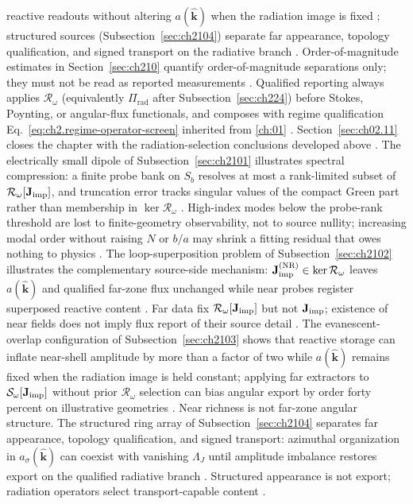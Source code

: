 reactive readouts without altering \(a(\widehat{\mathbf{k}})\) when the radiation image is fixed
\cite{mandel1995}; structured sources (Subsection~\ref{sec:ch2104}) separate far
appearance, topology qualification, and signed transport on the radiative branch
\cite{belinfante1940}. Order-of-magnitude estimates in Section~\ref{sec:ch210} quantify
order-of-magnitude separations only; they must not be read as reported measurements
\cite{hansen1988}. Qualified reporting always applies \(\mathcal{R}_\omega\) (equivalently
\(\Pi_{\mathrm{rad}}\) after Subsection~\ref{sec:ch224}) before Stokes, Poynting, or angular-flux functionals, and
composes with regime qualification Eq.~\eqref{eq:ch2.regime-operator-screen} inherited from
\ref{ch:01} \cite{stratton1941}. Section~\ref{sec:ch02.11} closes the chapter with the radiation-selection conclusions developed above \cite{stratton1941}.
The electrically small dipole of Subsection~\ref{sec:ch2101} illustrates spectral compression: a finite probe bank on $S_b$ resolves at most a rank-limited subset of $\mathcal{R}_\omega[\mathbf{J}_{\mathrm{imp}}]$, and truncation error tracks singular values of the compact Green part rather than membership in $\ker\mathcal{R}_\omega$ \cite{harrington2001}. High-index modes below the probe-rank threshold are lost to finite-geometry observability, not to source nullity; increasing modal order without raising $N$ or $b/a$ may shrink a fitting residual that owes nothing to physics \cite{hansen1988}. The loop-superposition problem of Subsection~\ref{sec:ch2102} illustrates the complementary source-side mechanism: $\mathbf{J}_{\mathrm{imp}}^{\mathrm{(NR)}}\in\ker\mathcal{R}_\omega$ leaves $a(\widehat{\mathbf{k}})$ and qualified far-zone flux unchanged while near probes register superposed reactive content \cite{devaney2004}. Far data fix $\mathcal{R}_\omega[\mathbf{J}_{\mathrm{imp}}]$ but not $\mathbf{J}_{\mathrm{imp}}$; existence of near fields does not imply flux report of their source detail \cite{stratton1941}. The evanescent-overlap configuration of Subsection~\ref{sec:ch2103} shows that reactive storage can inflate near-shell amplitude by more than a factor of two while $a(\widehat{\mathbf{k}})$ remains fixed when the radiation image is held constant; applying far extractors to $\mathcal{S}_\omega[\mathbf{J}_{\mathrm{imp}}]$ without prior $\mathcal{R}_\omega$ selection can bias angular export by order forty percent on illustrative geometries \cite{hansen1988}. Near richness is not far-zone angular structure. The structured ring array of Subsection~\ref{sec:ch2104} separates far appearance, topology qualification, and signed transport: azimuthal organization in $a_\sigma(\widehat{\mathbf{k}})$ can coexist with vanishing $\Lambda_J$ until amplitude imbalance restores export on the qualified radiative branch \cite{belinfante1940}. Structured appearance is not export; radiation operators select transport-capable content \cite{stratton1941}.
